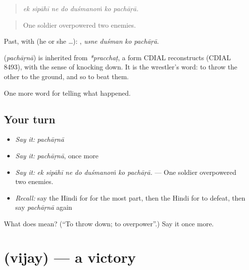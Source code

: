 \begin{quote}
      
\end{quote}

\begin{quote}
\emph{ek sipāhī ne do duśmanoṁ ko pachāṛā.}
\end{quote}

\begin{quote}
One soldier overpowered two enemies.
\end{quote}

Past, with  (he or she …):    , \emph{usne duśman ko pachāṛā}.

\begin{cousinweb}
\textbf{} (\emph{pachāṛnā}) is inherited from \emph{*pracchaṭ}, a form CDIAL reconstructs (CDIAL 8493), with the sense of knocking down. It is the wrestler's word: to throw the other to the ground, and so to beat them.
\end{cousinweb}

\begin{grammarlens}[title={What you've built}]
One more word for telling what happened.
\end{grammarlens}

\subsection*{Your turn}
\begin{itemize}
\raggedright
  \item \emph{Say it:} \emph{pachāṛnā}
  \item \emph{Say it:} \emph{pachāṛnā}, once more
  \item \emph{Say it:} \emph{ek sipāhī ne do duśmanoṁ ko pachāṛā.} — One soldier overpowered two enemies.
  \item \emph{Recall:} say the Hindi for for the most part, then the Hindi for to defeat, then say \emph{pachāṛnā} again
\end{itemize}

\begin{tcolorbox}[breakable,colback=teal!4,colframe=teal!35!black,title={Before you move on}]
What does  mean? (\textquotedblleft{}To throw down; to overpower\textquotedblright{}.) Say it once more.
\end{tcolorbox}
\section[\texorpdfstring{\hi{विजय} (vijay)}{विजय (vijay)}]{ (vijay) — a victory}

